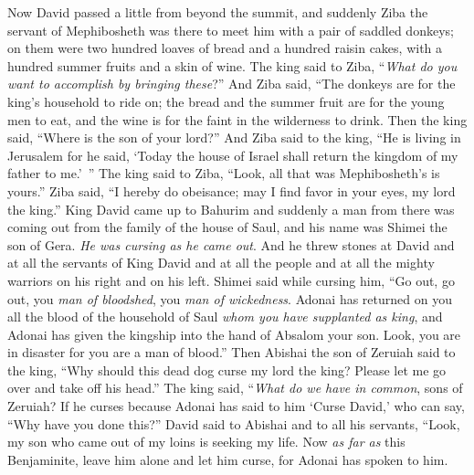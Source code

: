 \begin{biblechapter} %
 Now David passed a little from beyond the summit, and suddenly Ziba the servant of Mephibosheth was there to meet him with a pair of saddled donkeys; on them were two hundred loaves of bread and a hundred raisin cakes, with a hundred summer fruits and a skin of wine.
\verse The king said to Ziba, “\textit{What do you want to accomplish by bringing these}?” And Ziba said, “The donkeys are for the king’s household to ride on; the bread and the summer fruit are for the young men to eat, and the wine is for the faint in the wilderness to drink.
\verse Then the king said, “Where is the son of your lord?” And Ziba said to the king, “He is living in Jerusalem for he said, ‘Today the house of Israel shall return the kingdom of my father to me.’ ”
\verse The king said to Ziba, “Look, all that was Mephibosheth’s is yours.” Ziba said, “I hereby do obeisance; may I find favor in your eyes, my lord the king.”
 King David came up to Bahurim and suddenly a man from there was coming out from the family of the house of Saul, and his name was Shimei the son of Gera. \textit{He was cursing as he came out}.
\verse And he threw stones at David and at all the servants of King David and at all the people and at all the mighty warriors on his right and on his left.
\verse Shimei said while cursing him, “Go out, go out, you \textit{man of bloodshed}, you \textit{man of wickedness}.
\verse Adonai has returned on you all the blood of the household of Saul \textit{whom you have supplanted as king}, and Adonai has given the kingship into the hand of Absalom your son. Look, you are in disaster for you are a man of blood.”
\verse Then Abishai the son of Zeruiah said to the king, “Why should this dead dog curse my lord the king? Please let me go over and take off his head.”
\verse The king said, “\textit{What do we have in common}, sons of Zeruiah? If he curses because Adonai has said to him ‘Curse David,’ who can say, “Why have you done this?”
\verse David said to Abishai and to all his servants, “Look, my son who came out of my loins is seeking my life. Now \textit{as far as} this Benjaminite, leave him alone and let him curse, for Adonai has spoken to him.

\end{biblechapter}
